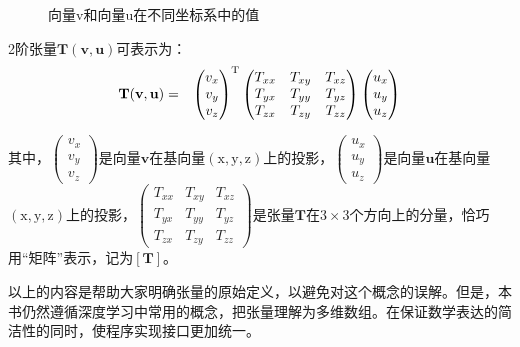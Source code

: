 \begin{figure}[htp]
\centering

\caption{向量v和向量u在不同坐标系中的值}
\label{fig:5-26}
\end {figure}

\parinterval 2阶张量$ \mathbf T(\mathbf v,\mathbf u) $可表示为：
\begin{eqnarray}
\mathbf T(\mathbf v,\mathbf u)&=&{\begin{pmatrix} v_x\\v_y\\v_z\end{pmatrix}}^{\rm T}\begin{pmatrix}
   T_{xx} & T_{xy} & T_{xz}\\
   T_{yx} & T_{yy} & T_{yz}\\
   T_{zx} & T_{zy} & T_{zz}\end{pmatrix} \begin{pmatrix} u_x\\u_y\\u_z\end{pmatrix}
\label{eq:5-23}
\end{eqnarray}

\parinterval 其中，$ \begin{pmatrix} v_x\\v_y\\v_z\end{pmatrix} $是向量$ \mathbf v $在基向量$(\textrm{x},\textrm{y},\textrm{z})$上的投影，$ \begin{pmatrix} u_x\\u_y\\u_z\end{pmatrix} $是向量$ \mathbf u $在基向量$(\textrm{x},\textrm{y},\textrm{z})$上的投影，$ \begin{pmatrix}T_{xx} & T_{xy} & T_{xz}\\T_{yx} & T_{yy} & T_{yz}\\T_{zx} & T_{zy} & T_{zz}\end{pmatrix} $是张量$ \mathbf T $在$3 \times 3$个方向上的分量，恰巧用``矩阵''表示，记为$ [\mathbf T] $。

\parinterval 以上的内容是帮助大家明确张量的原始定义，以避免对这个概念的误解。但是，本书仍然遵循深度学习中常用的概念，把张量理解为多维数组。在保证数学表达的简洁性的同时，使程序实现接口更加统一。



